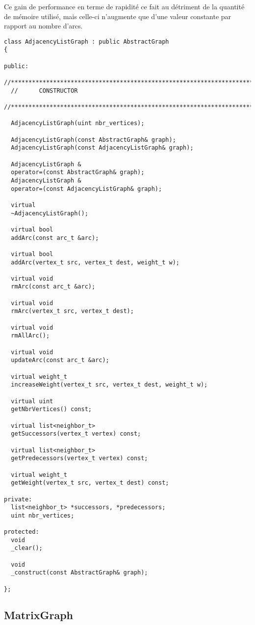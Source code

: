 Ce gain de performance en terme de rapidité ce fait au détriment de la
quantité de mémoire utilisé, mais celle-ci n'augmente que d'une valeur
constante par rapport au nombre d'arcs.

\begin{verbatim}
class AdjacencyListGraph : public AbstractGraph
{

public:
  //************************************************************************************************
  //      CONSTRUCTOR
  //************************************************************************************************

  AdjacencyListGraph(uint nbr_vertices);

  AdjacencyListGraph(const AbstractGraph& graph);
  AdjacencyListGraph(const AdjacencyListGraph& graph);

  AdjacencyListGraph &
  operator=(const AbstractGraph& graph);
  AdjacencyListGraph &
  operator=(const AdjacencyListGraph& graph);

  virtual
  ~AdjacencyListGraph();

  virtual bool
  addArc(const arc_t &arc);

  virtual bool
  addArc(vertex_t src, vertex_t dest, weight_t w);

  virtual void
  rmArc(const arc_t &arc);

  virtual void
  rmArc(vertex_t src, vertex_t dest);

  virtual void
  rmAllArc();

  virtual void
  updateArc(const arc_t &arc);

  virtual weight_t
  increaseWeight(vertex_t src, vertex_t dest, weight_t w);

  virtual uint
  getNbrVertices() const;

  virtual list<neighbor_t>
  getSuccessors(vertex_t vertex) const;

  virtual list<neighbor_t>
  getPredecessors(vertex_t vertex) const;

  virtual weight_t
  getWeight(vertex_t src, vertex_t dest) const;

private:
  list<neighbor_t> *successors, *predecessors;
  uint nbr_vertices;

protected:
  void
  _clear();

  void
  _construct(const AbstractGraph& graph);

};
\end{verbatim}

\subsection{MatrixGraph}

